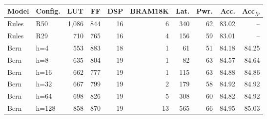\begin{tabular}{llrrrrrrrr}
\toprule
Model & Config. & LUT & FF & DSP & BRAM18K & Lat. & Pwr. & Acc. & Acc$_{fp}$ \\
\midrule
Rules & R50 & 1,086 & 844 & 16 & 6 & 340 & 62 & 83.02 & -- \\
Rules & R29 & 710 & 765 & 16 & 4 & 156 & 59 & 83.01 & -- \\
Bern & h=4 & 553 & 883 & 18 & 1 & 61 & 51 & 84.18 & 84.25 \\
Bern & h=8 & 635 & 804 & 19 & 1 & 82 & 63 & 84.57 & 84.64 \\
Bern & h=16 & 662 & 777 & 19 & 1 & 115 & 63 & 84.88 & 84.86 \\
Bern & h=32 & 667 & 799 & 19 & 2 & 179 & 58 & 84.92 & 84.92 \\
Bern & h=64 & 698 & 826 & 19 & 5 & 308 & 60 & 84.82 & 84.92 \\
Bern & h=128 & 858 & 870 & 19 & 13 & 565 & 66 & 84.95 & 85.03 \\
\bottomrule
\end{tabular}
